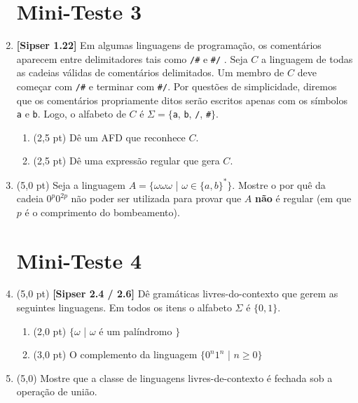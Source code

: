 \documentclass[12pt,a4paper,oneside]{article}
\begin{document}
\begin{enumerate}
	
	\section*{Mini-Teste 3}
	
	\item {\bf [Sipser 1.22]} Em algumas linguagens de programação, os comentários aparecem entre delimitadores tais como {\tt /\#} e {\tt \#/} . Seja $C$ a linguagem de todas as cadeias válidas de comentários delimitados. Um membro de $C$ deve começar com {\tt /\#} e terminar com {\tt \#/}. Por questões de simplicidade, diremos que os comentários propriamente ditos serão escritos apenas com os símbolos {\tt a} e {\tt b}. Logo, o alfabeto de $C$ é $\Sigma = \{${\tt a}, {\tt b}, {\tt /}, {\tt \#}$\}$. 
	\begin{enumerate}
		\item (2,5 pt) Dê um AFD que reconhece $C$.
		\item (2,5 pt) Dê uma expressão regular que gera $C$.
	\end{enumerate}
	
	\vspace*{0.5cm}
	
	\item (5,0 pt) Seja a linguagem $A = \{\omega \omega \omega$ | $\omega \in \{a,b\}^*\}$. Mostre o por quê da cadeia $0^p0^{2p}$ não poder ser utilizada para provar que $A$ {\bf não} é regular (em que $p$ é o comprimento do bombeamento).

	\section*{Mini-Teste 4}

	\item (5,0 pt) {\bf [Sipser 2.4 / 2.6]}  Dê gramáticas livres-do-contexto que gerem as seguintes linguagens. Em todos os itens o alfabeto $\Sigma$ é $\{0,1\}$.
	\begin{enumerate}
		\item (2,0 pt) $\{\omega$ | $\omega$ é um palíndromo $\}$
		\item (3,0 pt) O complemento da linguagem $\{0^n 1^n$ | $n \geq 0 \}$
	\end{enumerate}

	\item (5,0) Mostre que a classe de linguagens livres-de-contexto é fechada sob a operação de união.


\end{enumerate}
\end{document}
